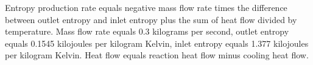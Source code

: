 Entropy production rate equals negative mass flow rate times the difference between outlet entropy and inlet entropy plus the sum of heat flow divided by temperature.  
Mass flow rate equals 0.3 kilograms per second, outlet entropy equals 0.1545 kilojoules per kilogram Kelvin, inlet entropy equals 1.377 kilojoules per kilogram Kelvin.  
Heat flow equals reaction heat flow minus cooling heat flow.